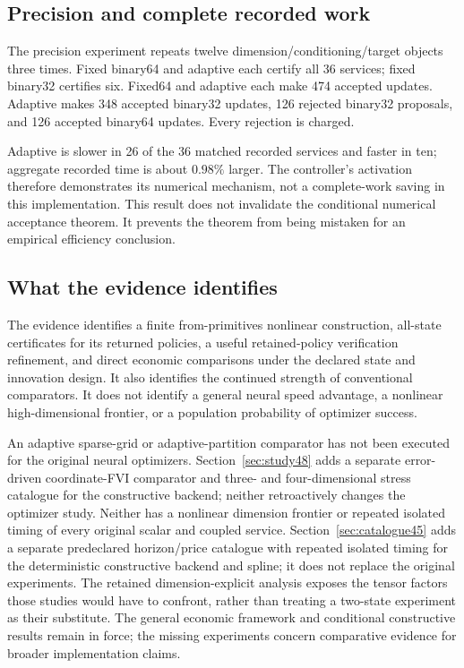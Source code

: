 \documentclass[ecta,nameyear,draft]{econsocart}
\begin{document}
\subsection{Precision and complete recorded work}

The precision experiment repeats twelve dimension/conditioning/target objects three times. Fixed binary64 and adaptive each certify all 36 services; fixed binary32 certifies six. Fixed64 and adaptive each make 474 accepted updates. Adaptive makes 348 accepted binary32 updates, 126 rejected binary32 proposals, and 126 accepted binary64 updates. Every rejection is charged.

Adaptive is slower in 26 of the 36 matched recorded services and faster in ten; aggregate recorded time is about $0.98\%$ larger. The controller's activation therefore demonstrates its numerical mechanism, not a complete-work saving in this implementation. This result does not invalidate the conditional numerical acceptance theorem. It prevents the theorem from being mistaken for an empirical efficiency conclusion.

\subsection{What the evidence identifies}
The evidence identifies a finite from-primitives nonlinear construction, all-state certificates for its returned policies, a useful retained-policy verification refinement, and direct economic comparisons under the declared state and innovation design. It also identifies the continued strength of conventional comparators. It does not identify a general neural speed advantage, a nonlinear high-dimensional frontier, or a population probability of optimizer success.

An adaptive sparse-grid or adaptive-partition comparator has not been executed for the original neural optimizers. Section~\ref{sec:study48} adds a separate error-driven coordinate-FVI comparator and three- and four-dimensional stress catalogue for the constructive backend; neither retroactively changes the optimizer study. Neither has a nonlinear dimension frontier or repeated isolated timing of every original scalar and coupled service. Section~\ref{sec:catalogue45} adds a separate predeclared horizon/price catalogue with repeated isolated timing for the deterministic constructive backend and spline; it does not replace the original experiments. The retained dimension-explicit analysis exposes the tensor factors those studies would have to confront, rather than treating a two-state experiment as their substitute. The general economic framework and conditional constructive results remain in force; the missing experiments concern comparative evidence for broader implementation claims.
\end{document}
